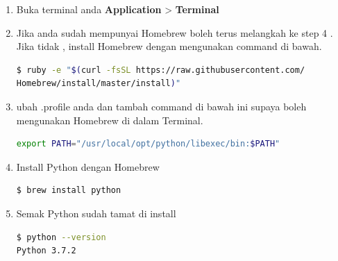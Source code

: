 \begin{enumerate}
	\item Buka terminal anda \textbf{Application} > \textbf{Terminal} 
	\item Jika anda sudah mempunyai Homebrew boleh terus melangkah ke step 4 . Jika tidak , install Homebrew dengan mengunakan command di bawah. 
		\begin{lstlisting}[language=bash]
$ ruby -e "$(curl -fsSL https://raw.githubusercontent.com/
Homebrew/install/master/install)"
		\end{lstlisting}
	\item ubah .profile anda dan tambah command di bawah ini supaya boleh mengunakan Homebrew di dalam Terminal. 
		\begin{lstlisting}[language=bash]
export PATH="/usr/local/opt/python/libexec/bin:$PATH"
		\end{lstlisting}
	\item Install Python dengan Homebrew
		\begin{lstlisting}[language=bash]
$ brew install python
		\end{lstlisting}
	\item Semak Python sudah tamat di install 
		\begin{lstlisting}[language=bash]
$ python --version
Python 3.7.2
		\end{lstlisting}

\end{enumerate}
